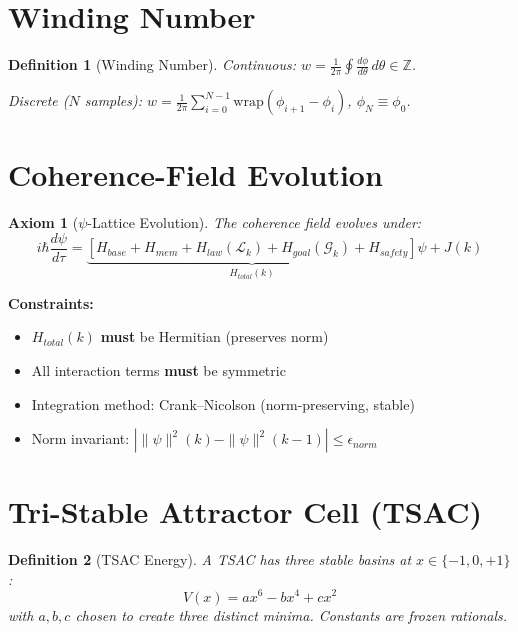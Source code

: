 \documentclass[11pt, a4paper]{report}
\newtheorem{definition}{Definition}[chapter]
\newtheorem{axiom}{Axiom}[chapter]
\begin{document}
\section{Winding Number}

\begin{definition}[Winding Number]
Continuous: $w = \frac{1}{2\pi} \oint \frac{d\phi}{d\theta}\, d\theta \in \mathbb{Z}$.

Discrete ($N$ samples): $w = \frac{1}{2\pi} \sum_{i=0}^{N-1} \text{wrap}(\phi_{i+1} - \phi_i)$,
$\phi_N \equiv \phi_0$.
\end{definition}

\section{Coherence-Field Evolution}

\begin{axiom}[$\psi$-Lattice Evolution]
The coherence field evolves under:
\begin{equation}
  \boxed{i\hbar \frac{d\psi}{d\tau} =
    \underbrace{[H_{base} + H_{mem} + H_{law}(\mathcal{L}_k) + H_{goal}(\mathcal{G}_k) + H_{safety}]}_{H_{total}(k)}
    \psi + J(k)}
\end{equation}
\end{axiom}

\textbf{Constraints:}
\begin{itemize}[nosep]
  \item $H_{total}(k)$ \textbf{must} be Hermitian (preserves norm)
  \item All interaction terms \textbf{must} be symmetric
  \item Integration method: Crank--Nicolson (norm-preserving, stable)
  \item Norm invariant: $| \|\psi\|^2(k) - \|\psi\|^2(k-1) | \leq \epsilon_{norm}$
\end{itemize}

\section{Tri-Stable Attractor Cell (TSAC)}

\begin{definition}[TSAC Energy]
A TSAC has three stable basins at $x \in \{-1, 0, +1\}$:
\begin{equation}
  V(x) = a x^6 - b x^4 + c x^2
\end{equation}
with $a, b, c$ chosen to create three distinct minima. Constants are
frozen rationals.
\end{definition}
\end{document}
